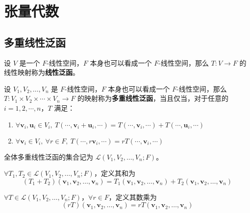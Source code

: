 \section{张量代数}

\subsection{多重线性泛函}

\begin{definition}
    设 $V$ 是一个 $F$-线性空间，$F$ 本身也可以看成一个 $F$-线性空间，那么 $T:V\to F$ 的线性映射称为\textbf{线性泛函}。
    \label{def:linear_functional}
\end{definition}

\begin{definition}
    设 $V_1,V_2,\ldots,V_n$ 是 $F$-线性空间，$F$ 本身也可以看成一个 $F$-线性空间，那么 $T:V_1\times V_2\times \cdots \times V_n \to F$ 的映射称为\textbf{多重线性泛函}，当且仅当，对于任意的 $i = 1,2,\cdots,n$，$T$ 满足：
    \begin{enumerate}
        \item $\forall \mathbf{v}_i,\mathbf{u}_i \in V_i,\ T(\cdots,\mathbf{v}_i+\mathbf{u}_i,\cdots) = T(\cdots,\mathbf{v}_i,\cdots)+T(\cdots,\mathbf{u}_i,\cdots)$
        \item $\forall \mathbf{v}_i \in V_i,\ \forall r\in F,\ T(\cdots,r\mathbf{v}_i,\cdots) = rT(\cdots,\mathbf{v}_i,\cdots)$
    \end{enumerate}
    全体多重线性泛函的集合记为 $\mathcal{L}(V_1,V_2,\ldots,V_n;F)$。
    \label{def:multilinear_functional}
\end{definition}

\begin{definition}[多重线性泛函的加法]
    $\forall T_1,T_2\in \mathcal{L}(V_1,V_2,\ldots,V_n;F)$，定义其和为
    \[
        (T_1+T_2)(\mathbf{v}_1,\mathbf{v}_2,\ldots,\mathbf{v}_n) = T_1(\mathbf{v}_1,\mathbf{v}_2,\ldots,\mathbf{v}_n) + T_2(\mathbf{v}_1,\mathbf{v}_2,\ldots,\mathbf{v}_n)
    \]
    \label{def:multilinear_functional_addition}
\end{definition}

\begin{definition}[多重线性泛函的数乘]
    $\forall T\in \mathcal{L}(V_1,V_2,\ldots,V_n;F)$，$\forall r\in F$，定义其数乘为
    \[
        (rT)(\mathbf{v}_1,\mathbf{v}_2,\ldots,\mathbf{v}_n) = rT(\mathbf{v}_1,\mathbf{v}_2,\ldots,\mathbf{v}_n)
    \]
    \label{def:multilinear_functional_scalar_multiplication}
\end{definition}

